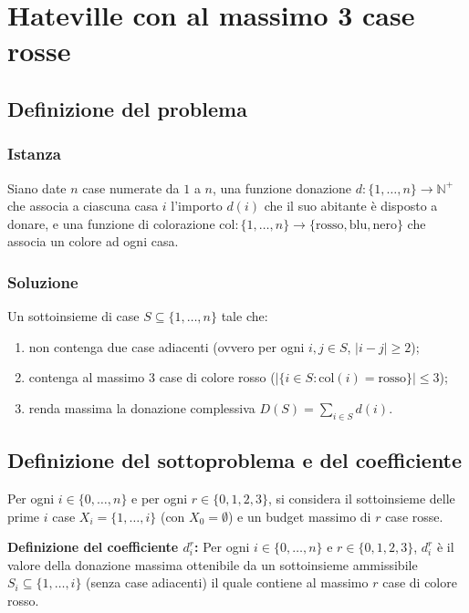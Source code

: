 \chapter{Hateville con al massimo 3 case rosse}

\section{Definizione del problema}

\subsection{Istanza}
Siano date $n$ case numerate da $1$ a $n$, una funzione donazione $d : \{1, \dots, n\} \to \mathbb{N}^+$ che associa a ciascuna casa $i$ l'importo $d(i)$ che il suo abitante è disposto a donare, e una funzione di colorazione $\text{col} : \{1, \dots, n\} \to \{\text{rosso}, \text{blu}, \text{nero}\}$ che associa un colore ad ogni casa.

\subsection{Soluzione}
Un sottoinsieme di case $S \subseteq \{1, \dots, n\}$ tale che:
\begin{enumerate}
    \item non contenga due case adiacenti (ovvero per ogni $i, j \in S$, $|i - j| \ge 2$);
    \item contenga al massimo $3$ case di colore rosso ($|\{i \in S : \text{col}(i) = \text{rosso}\}| \le 3$);
    \item renda massima la donazione complessiva $D(S) = \sum_{i \in S} d(i)$.
\end{enumerate}

\section{Definizione del sottoproblema e del coefficiente}
Per ogni $i \in \{0, \dots, n\}$ e per ogni $r \in \{0, 1, 2, 3\}$, si considera il sottoinsieme delle prime $i$ case $X_i = \{1, \dots, i\}$ (con $X_0 = \emptyset$) e un budget massimo di $r$ case rosse.

\medskip
\noindent
\textbf{Definizione del coefficiente $d_i^r$:} Per ogni $i \in \{0, \dots, n\}$ e $r \in \{0, 1, 2, 3\}$, $d_i^r$ è il valore della donazione massima ottenibile da un sottoinsieme ammissibile $S_i \subseteq \{1, \dots, i\}$ (senza case adiacenti) il quale contiene al massimo $r$ case di colore rosso.

